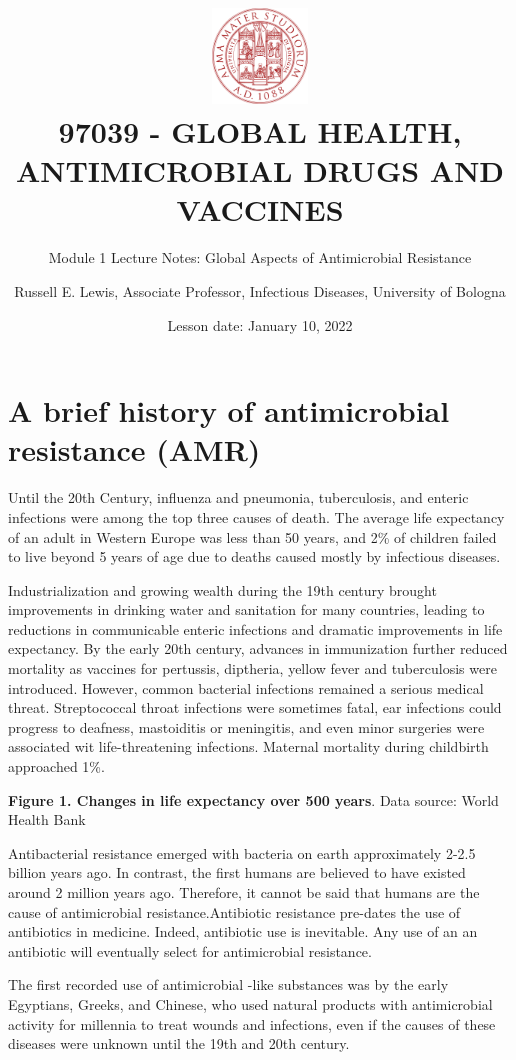 \documentclass[
]{book}
\title{\includegraphics[width=1in,height=\textheight]{images/logo.png}\\
97039 - GLOBAL HEALTH, ANTIMICROBIAL DRUGS AND VACCINES}
\subtitle{Module 1 Lecture Notes: Global Aspects of Antimicrobial Resistance}
\author{Russell E. Lewis, Associate Professor, Infectious Diseases, University of Bologna}
\date{Lesson date: January 10, 2022}
\begin{document}
\maketitle

{
\setcounter{tocdepth}{1}
\tableofcontents
}
\hypertarget{a-brief-history-of-antimicrobial-resistance-amr}{%
\section*{A brief history of antimicrobial resistance (AMR)}\label{a-brief-history-of-antimicrobial-resistance-amr}}

Until the 20th Century, influenza and pneumonia, tuberculosis, and enteric infections were among the top three causes of death. The average life expectancy of an adult in Western Europe was less than 50 years, and 2\% of children failed to live beyond 5 years of age due to deaths caused mostly by infectious diseases.

Industrialization and growing wealth during the 19th century brought improvements in drinking water and sanitation for many countries, leading to reductions in communicable enteric infections and dramatic improvements in life expectancy. By the early 20th century, advances in immunization further reduced mortality as vaccines for pertussis, diptheria, yellow fever and tuberculosis were introduced. However, common bacterial infections remained a serious medical threat. Streptococcal throat infections were sometimes fatal, ear infections could progress to deafness, mastoiditis or meningitis, and even minor surgeries were associated wit life-threatening infections. Maternal mortality during childbirth approached 1\%.

\textbf{Figure 1. Changes in life expectancy over 500 years}. Data source: World Health Bank

Antibacterial resistance emerged with bacteria on earth approximately 2-2.5 billion years ago. In contrast, the first humans are believed to have existed around 2 million years ago. Therefore, it cannot be said that humans are the cause of antimicrobial resistance.Antibiotic resistance pre-dates the use of antibiotics in medicine. Indeed, antibiotic use is inevitable. Any use of an an antibiotic will eventually select for antimicrobial resistance.

The first recorded use of antimicrobial -like substances was by the early Egyptians, Greeks, and Chinese, who used natural products with antimicrobial activity for millennia to treat wounds and infections, even if the causes of these diseases were unknown until the 19th and 20th century.
\end{document}

